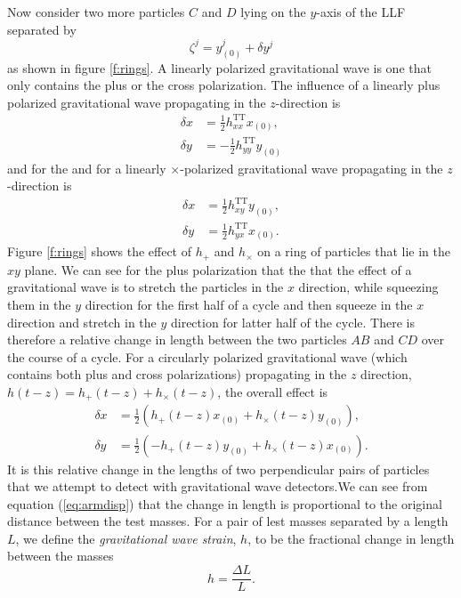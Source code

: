 Now consider two more particles $C$ and $D$ lying on the $y$-axis of the LLF
separated by 
\begin{equation}
\zeta^j = y^j_{(0)} + \delta y^j
\end{equation}
as shown in figure \ref{f:rings}. A linearly polarized gravitational wave is
one that only contains the plus or the cross polarization. The influence of
a linearly plus polarized gravitational wave propagating in the $z$-direction
is
\begin{align}
\delta x &= \frac{1}{2} h_{xx}^\mathrm{TT} x_{(0)},\\
\delta y &= -\frac{1}{2} h_{yy}^\mathrm{TT} y_{(0)}
\end{align}
and for the and for a linearly $\times$-polarized gravitational wave
propagating in the $z$-direction is
\begin{align}
\delta x &= \frac{1}{2} h_{xy}^\mathrm{TT} y_{(0)},\\
\delta y &= \frac{1}{2} h_{yx}^\mathrm{TT} x_{(0)}.
\end{align}
Figure \ref{f:rings} shows the effect of $h_{+}$ and $h_{\times}$ on a ring
of particles that lie in the $xy$ plane. We can see for the plus polarization
that the that the effect of a gravitational wave is to stretch the particles
in the $x$ direction, while squeezing them in the $y$ direction for the first
half of a cycle and then squeeze in the $x$ direction and stretch in the $y$
direction for latter half of the cycle.  There is therefore a relative change
in length between the two particles $AB$ and $CD$ over the course of a cycle.
For a circularly polarized gravitational wave (which contains both plus and
cross polarizations) propagating in the $z$ direction, $h(t-z) =
h_{+}(t-z) + h_{\times}(t-z)$, the overall effect is
\begin{align}
\delta x &= \frac{1}{2}\left(h_{+}(t-z) x_{(0)} + h_{\times}(t-z) y_{(0)}\right),\\
\delta y &= \frac{1}{2}\left(-h_{+}(t-z) y_{(0)} + h_{\times}(t-z) x_{(0)}\right).
\label{eq:armdisp}
\end{align}
It is this relative change in the lengths of two perpendicular pairs of
particles that we attempt to detect with gravitational wave detectors.We can
see from equation (\ref{eq:armdisp}) that the change in length is proportional
to the original distance between the test masses. For a pair of lest masses
separated by a length $L$, we define the \emph{gravitational wave strain},
$h$, to be the fractional change in length between the masses
\begin{equation}
h = \frac{\Delta L}{L}.
\end{equation}

